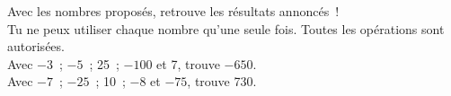 \begin{enigme}

Avec les nombres proposés, retrouve les résultats annoncés ! \\[0.5em]
Tu ne peux utiliser chaque nombre qu'une seule fois. Toutes les opérations sont autorisées.\\[0.5em]
Avec $-3$ ; $-5$ ; 25 ; $-100$ et 7, trouve $-650$.\\[0.5em]
Avec $-7$ ; $-25$ ; 10 ; $-8$ et $-75$, trouve 730.

\end{enigme} 
